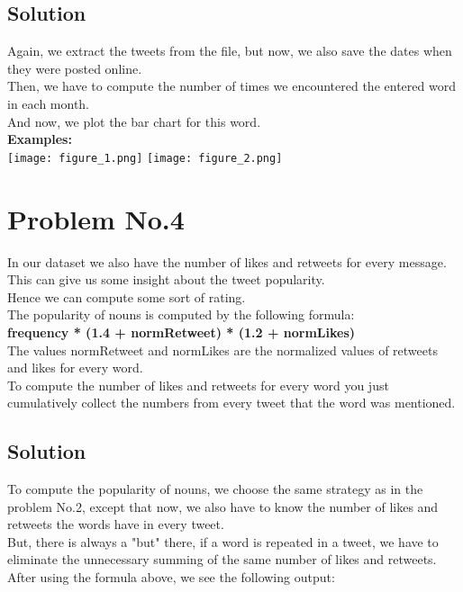 \documentclass{article}
\begin{document}
    \vspace{3em}

    \subsection{Solution}
      Again, we extract the tweets from the file, but now, we also save the
      dates when they were posted online.\\
      Then, we have to compute the number of times we encountered the entered word
      in each month.\\
      And now, we plot the bar chart for this word.\\
      \textbf{Examples:}\\
      \texttt{[image: figure\_1.png]}
      \texttt{[image: figure\_2.png]}

    \newpage


    \section{Problem No.4}
      In our dataset we also have the number of likes and retweets for every message.\\
      This can give us some insight about the tweet popularity.\\
      Hence we can compute some sort of rating.\\
      The popularity of nouns is computed by the following formula:\\
      \colorbox{black!10!white}{\textbf{frequency * (1.4 + normRetweet) * (1.2 + normLikes)}}\\
      The values normRetweet and normLikes are the normalized values of retweets
      and likes for every word.\\
      To compute the number of likes and retweets for every word you just
      cumulatively collect the numbers from every tweet that the word was mentioned.

    \subsection{Solution}
      To compute the popularity of nouns, we choose the same strategy as in the
      problem No.2, except that now, we also have to know the number of likes
      and retweets the words have in every tweet.\\
      But, there is always a "but" there, if a word is repeated in a tweet, we
      have to eliminate the unnecessary summing of the same number of likes
      and retweets.\\
      After using the formula above, we see the following output:\\
\end{document}
